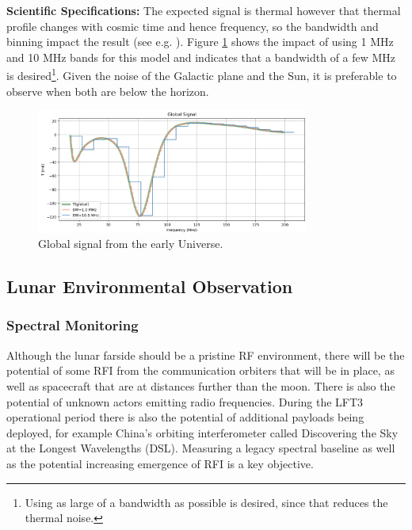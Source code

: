 \textbf{Scientific Specifications:} 
The expected signal is thermal however that thermal profile changes with cosmic time and hence frequency, so the bandwidth and binning impact the result (see e.g. \citealt{2017PASP..129d5001D}).  Figure \ref{fig:global_T_bw} shows the impact of using 1 MHz and 10 MHz bands for this model and indicates that a bandwidth of a few MHz is desired\footnote{Using as large of a bandwidth as possible is desired, since that reduces the thermal noise.}.
Given the noise of the Galactic plane and the Sun, it is preferable to observe when both are below the horizon.

\begin{figure}[h]
    \centering
    \includegraphics[width=0.8\textwidth]{figures/global_with_bw.png}
    \caption{Global signal from the early Universe.}
    \label{fig:global_T_bw}
\end{figure}

\subsection{Lunar Environmental Observation}

\subsubsection{Spectral Monitoring}
Although the lunar farside should be a pristine RF environment, there will be the potential of some RFI from the communication orbiters that will be in place, as well as spacecraft that are at distances further than the moon.  There is also the potential of unknown actors emitting radio frequencies.  During the LFT3 operational period there is also the potential of additional payloads being deployed, for example China's orbiting interferometer called Discovering the Sky at the Longest Wavelengths (DSL).  Measuring a legacy spectral baseline as well as the potential increasing emergence of RFI is a key objective.



